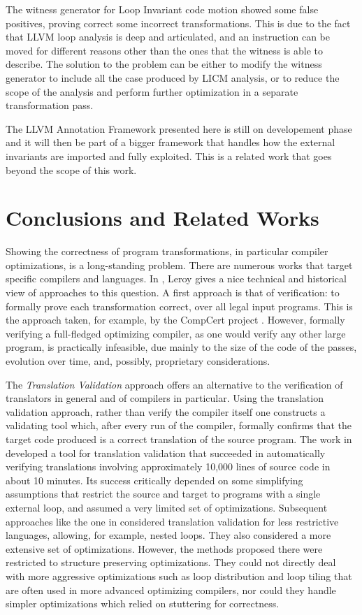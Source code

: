 The witness generator for Loop Invariant code motion showed some false positives, proving correct some incorrect transformations. This is due to the fact that LLVM loop analysis is deep and articulated, and an instruction can be moved for different reasons other than the ones that the witness is able to describe. The solution to the problem can be either to modify the witness generator to include all the case produced by LICM analysis, or to reduce the scope of the analysis and perform further optimization in a separate transformation pass.

The LLVM Annotation Framework presented here is still on developement phase and it will then be part of a bigger framework that handles how the external invariants are imported and fully exploited. This is a related work that goes beyond the scope of this work.

\section{Conclusions and Related Works}
\label{sub:related_works}
Showing the correctness of program transformations, in particular compiler optimizations, is a long-standing problem. There are numerous works that target specific compilers and languages. In  \cite{leroy2009formal}, Leroy gives a nice technical and historical view of approaches to this question. A first approach is that of verification: to formally prove each transformation correct, over all legal input programs. This is the approach taken, for example, by the CompCert project \cite{leroy2006formal}. However, formally verifying a full-fledged optimizing compiler, as one would verify any other large program, is practically infeasible, due mainly to the size of the code of the passes, evolution over time, and, possibly, proprietary considerations.

The \emph{Translation Validation} approach offers an alternative to the verification of translators in general and of compilers in particular. Using the translation validation approach, rather than verify the compiler itself one constructs a validating tool which, after every run of the compiler, formally confirms that the target code produced is a correct translation of the source program. The work in \cite{pnueli1998code} developed a tool for translation validation that succeeded in automatically verifying translations involving approximately 10,000 lines of source code in about 10 minutes. Its success critically depended on some simplifying assumptions that restrict the source and target to programs with a single external loop, and assumed a very limited set of optimizations. Subsequent approaches like the one in \cite{Rinard99crediblecompilation} considered translation validation for less restrictive languages, allowing, for example, nested loops. They also considered a more extensive set of optimizations. However, the methods proposed there were restricted to structure preserving optimizations. They could not directly deal with more aggressive optimizations such as loop distribution and loop tiling that are often used in more advanced optimizing compilers, nor could they handle simpler optimizations which relied on stuttering for correctness.

